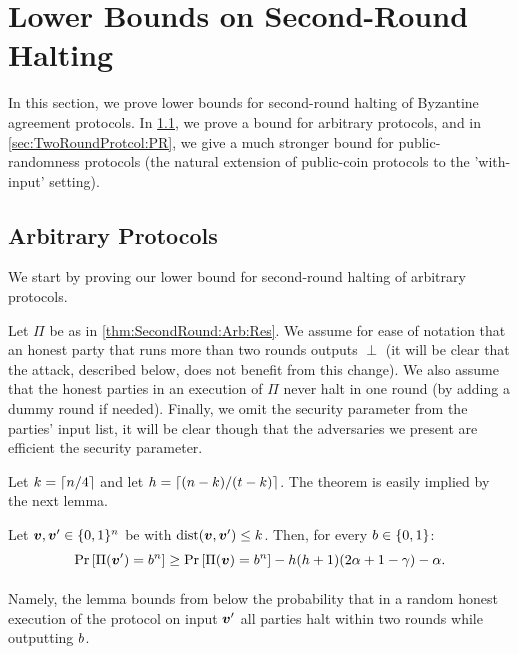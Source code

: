 \newcommand{\DF}{D_\F}
\newcommand{\SDF}{\Supp(D_\F)}


\section{Lower Bounds on Second-Round Halting}\label{sec:SecondRound}
In this section, we prove lower bounds for second-round halting of Byzantine agreement protocols. In \cref{sec:TwoRoundProtcol:Arbitrary}, we prove a bound for arbitrary protocols, and in \cref{sec:TwoRoundProtcol:PR}, we give a much stronger bound for public-randomness protocols (the natural extension of public-coin protocols to the 'with-input' setting).

\subsection{Arbitrary Protocols}\label{sec:TwoRoundProtcol:Arbitrary}
We start by proving our lower bound for second-round halting of arbitrary protocols.


\begin{theorem}\label{thm:SecondRound:Arb:Res}
\ThmSecondRoundArb
\end{theorem}

Let $\Pi$ be as in \cref{thm:SecondRound:Arb:Res}. We assume for ease of notation that an honest party that runs more than two rounds outputs $\perp$ (it will be clear that the attack, described below, does not benefit from this change). We also assume \wlg that the honest parties in an execution of $\Pi$ never halt in one round (by adding a dummy round if needed). Finally, we omit the security parameter from the parties' input list, it will be clear though that the adversaries we present are efficient \wrt the security parameter.

Let $k =\left\lceil n/4 \right\rceil$ and let $h = \left\lceil (n-k)/(t-k) \right\rceil$. The theorem is easily implied by the next lemma.

\begin{lemma}\label{lemma:SecondRound:Arb}
	Let ${ \boldsymbol{v}},{ \boldsymbol{v}}' \in {\{0,1\}^n}$ be with $\mathrm{dist}({ \boldsymbol{v}},{ \boldsymbol{v}}') \le k$. Then, for every $b\in \{0,1\}$:
\[
\Pr_{}\left[\Pi({ \boldsymbol{v}}') = b^n\right] \ge \Pr_{}\left[\Pi({ \boldsymbol{v}}) = b^n\right] - h(h+1)(2\alpha + 1-\gamma) - \alpha.
\]
\end{lemma}
Namely, the lemma bounds from below the probability that in a random honest execution of the protocol on input ${ \boldsymbol{v}}'$ all parties halt within two rounds while outputting $b$.


